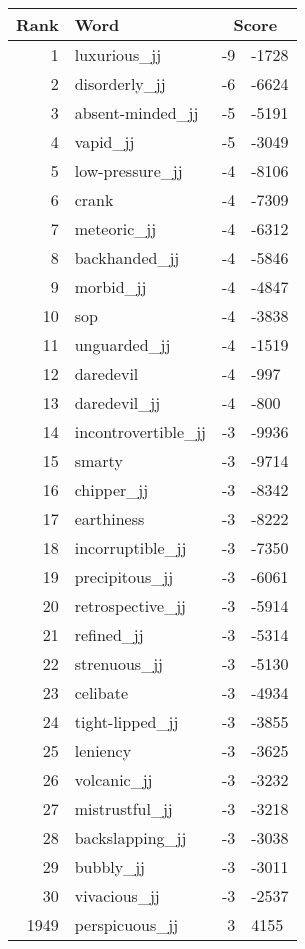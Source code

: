 \begin{longtable}[!htbp]{| rlr@{.}l |}
    \hline
    \textbf{Rank} & \textbf{Word} & \multicolumn{2}{c|}{\textbf{Score}} \\
    \hline
    \endhead
    1 & luxurious\_jj & -9 & -1728 \\
    2 & disorderly\_jj & -6 & -6624 \\
    3 & absent-minded\_jj & -5 & -5191 \\
    4 & vapid\_jj & -5 & -3049 \\
    5 & low-pressure\_jj & -4 & -8106 \\
    6 & crank & -4 & -7309 \\
    7 & meteoric\_jj & -4 & -6312 \\
    8 & backhanded\_jj & -4 & -5846 \\
    9 & morbid\_jj & -4 & -4847 \\
    10 & sop & -4 & -3838 \\
    11 & unguarded\_jj & -4 & -1519 \\
    12 & daredevil & -4 & -997 \\
    13 & daredevil\_jj & -4 & -800 \\
    14 & incontrovertible\_jj & -3 & -9936 \\
    15 & smarty & -3 & -9714 \\
    16 & chipper\_jj & -3 & -8342 \\
    17 & earthiness & -3 & -8222 \\
    18 & incorruptible\_jj & -3 & -7350 \\
    19 & precipitous\_jj & -3 & -6061 \\
    20 & retrospective\_jj & -3 & -5914 \\
    21 & refined\_jj & -3 & -5314 \\
    22 & strenuous\_jj & -3 & -5130 \\
    23 & celibate & -3 & -4934 \\
    24 & tight-lipped\_jj & -3 & -3855 \\
    25 & leniency & -3 & -3625 \\
    26 & volcanic\_jj & -3 & -3232 \\
    27 & mistrustful\_jj & -3 & -3218 \\
    28 & backslapping\_jj & -3 & -3038 \\
    29 & bubbly\_jj & -3 & -3011 \\
    30 & vivacious\_jj & -3 & -2537 \\
    1949 & perspicuous\_jj & 3 & 4155 \\

\end{longtable}
